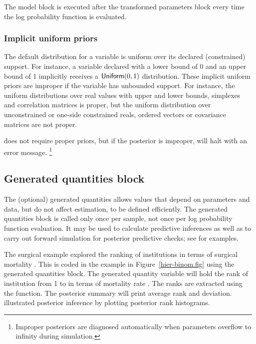 \documentclass[article]{jss}
\begin{document}
The model block is executed after the transformed parameters block
every time the log probability function is evaluated. 

\subsubsection{Implicit uniform priors}\label{implicit-prior.section}

The default distribution for a variable is uniform over its
declared (constrained) support.  For instance, a variable declared with a lower
bound of 0 and an upper bound of 1 implicitly receives a $\mbox{\sf
  Uniform}(0,1)$ distribution.  These implicit uniform priors are
improper if the variable has unbounded support.  For instance, the
uniform distributions over real values with upper and lower bounds,
simplexes and correlation matrices is proper, but the uniform
distribution over unconstrained or one-side constrained reals, ordered
vectors or covariance matrices are not proper.

 does not require proper priors, but if the posterior
is improper,  will halt with an error message.%
%
\footnote{Improper posteriors are diagnosed automatically when
  parameters overflow to infinity during simulation.}
 

\subsection{Generated quantities block}

The (optional) generated quantities allows values that depend on
parameters and data, but do not affect estimation, to be defined
efficiently.  The generated quantities block is called only once per
sample, not once per log probability function evaluation.  It may be
used to calculate predictive inferences as well as to carry out
forward simulation for posterior predictive checks; see
\citep{GelmanEtAl:2013} for examples.

The  surgical example explored the ranking of
institutions in terms of surgical mortality \citep[Examples, Volume
1]{LunnEtAl:2000}.  This is coded in the example in
Figure~\ref{hier-binom.fig} using the generated quantities block.  The
generated quantity variable  will hold the rank of
institution  from 1 to  in terms of mortality rate
.  The ranks are extracted using the 
function. The posterior summary will print average rank and deviation.
\citep{LunnEtAl:2000} illustrated posterior inference by plotting
posterior rank histograms.
\end{document}
